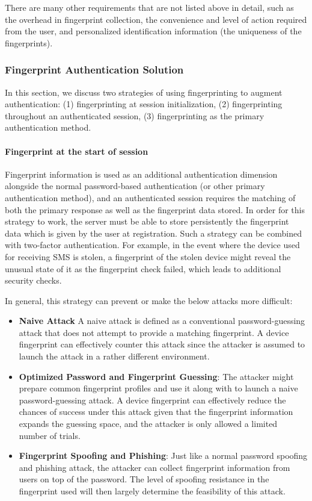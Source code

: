 \documentclass{acm_proc_article-sp}
\begin{document}
There are many other requirements that are not listed above in detail, such as the overhead in fingerprint collection, the convenience and level of action required from the user, and personalized identification information (the uniqueness of the fingerprints).


\subsubsection{Fingerprint Authentication Solution}
In this section, we discuss two strategies of using fingerprinting to augment authentication: (1) fingerprinting at session initialization, (2) fingerprinting throughout an authenticated session, (3) fingerprinting as the primary authentication method. 

\paragraph{Fingerprint at the start of session}
Fingerprint information is used as an additional authentication dimension alongside the normal password-based authentication (or other primary authentication method), and an authenticated session requires the matching of both the primary response as well as the fingerprint data stored.
In order for this strategy to work, the server must be able to store persistently the fingerprint data which is given by the user at registration. 
Such a strategy can be combined with two-factor authentication. For example, in the event where the device used for receiving SMS is stolen, a fingerprint of the stolen device might reveal the unusual state of it as the fingerprint check failed, which leads to additional security checks.

In general, this strategy can prevent or make the below attacks more difficult: 
\begin{itemize}
    \item \textbf{Naive Attack} A naive attack is defined as a conventional password-guessing attack that does not attempt to provide a matching fingerprint. A device fingerprint can effectively counter this attack since the attacker is assumed to launch the attack in a rather different environment. 
    \item \textbf{Optimized Password and Fingerprint Guessing}: The attacker might prepare common fingerprint profiles and use it along with to launch a naive password-guessing attack. A device fingerprint can effectively reduce the chances of success under this attack given that the fingerprint information expands the guessing space, and the attacker is only allowed a limited number of trials. 
    \item \textbf{Fingerprint Spoofing and Phishing}: Just like a normal password spoofing and phishing attack, the attacker can collect fingerprint information from users on top of the password. The level of spoofing resistance in the fingerprint used will then largely determine the feasibility of this attack. 
\end{itemize}
\end{document}
